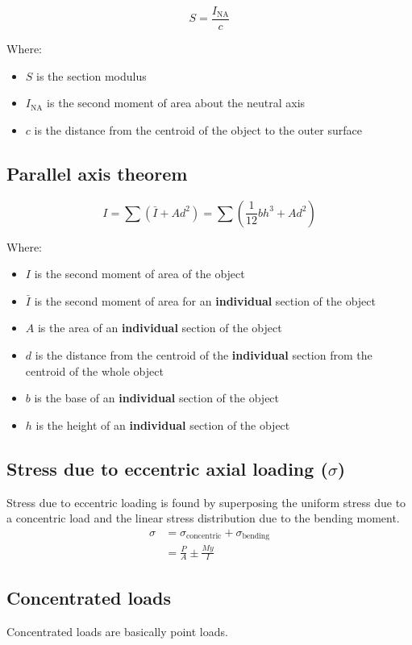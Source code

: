 \documentclass[11pt]{article}
\begin{document}
\[S = \frac{I_{\text{NA}}}{c}\]

Where:
\begin{itemize}
\item \(S\) is the section modulus
\item \(I_{\text{NA}}\) is the second moment of area about the neutral axis
\item \(c\) is the distance from the centroid of the object to the outer surface
\end{itemize}
\subsection{Parallel axis theorem}
\label{sec:orgefa1aad}
\[I = \sum \left(\bar{I} + Ad^2 \right) = \sum \left(\frac{1}{12} bh^3 + Ad^2 \right)\]

Where:
\begin{itemize}
\item \(I\) is the second moment of area of the object
\item \(\bar{I}\) is the second moment of area for an \textbf{individual} section of the object
\item \(A\) is the area of an \textbf{individual} section of the object
\item \(d\) is the distance from the centroid of the \textbf{individual} section from the centroid of the whole object
\item \(b\) is the base of an \textbf{individual} section of the object
\item \(h\) is the height of an \textbf{individual} section of the object
\end{itemize}
\subsection{Stress due to eccentric axial loading (\(\sigma\))}
\label{sec:orgdf56fde}
Stress due to eccentric loading is found by superposing the uniform stress due to a concentric load and the linear stress distribution due to the bending moment.
\begin{align*}
\sigma &= \sigma_{\text{concentric}} + \sigma_{\text{bending}} \\
&= \frac{P}{A} \pm \frac{My}{I}
\end{align*}
\subsection{Concentrated loads}
\label{sec:orgae4f010}
Concentrated loads are basically point loads.
\end{document}
